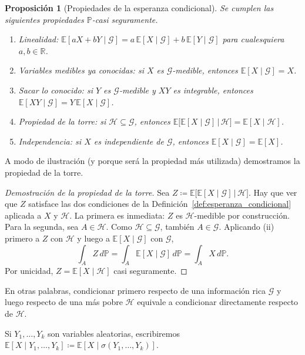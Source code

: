 \documentclass[11pt,a4paper,oneside]{report}
\theoremstyle{plain}
\newtheorem{proposicion}[teorema]{Proposición}
\theoremstyle{definition}
\theoremstyle{remark}
\newcommand{\R}{\mathbb{R}}
\newcommand{\E}{\mathbb{E}}
\newcommand{\PP}{\mathbb{P}}
\newcommand{\G}{\mathcal{G}}
\newcommand{\HH}{\mathcal{H}}
\newcommand{\1}{\mathbf{1}}
\newcommand{\eqdef}{\coloneqq}
\begin{document}
\begin{proposicion}[Propiedades de la esperanza condicional]
\label{prop:propiedades_esperanza_cond}
Se cumplen las siguientes propiedades $\PP$-casi seguramente.
\begin{enumerate}[label=\textnormal{(\roman*)}]
  \item \emph{Linealidad}: $\E[a X + b Y \mid \G] = a\, \E[X \mid \G]
        + b\, \E[Y \mid \G]$ para cualesquiera $a, b \in \R$.
  \item \emph{Variables medibles ya conocidas}: si $X$ es
        $\G$-medible, entonces $\E[X \mid \G] = X$.
  \item \emph{Sacar lo conocido}: si $Y$ es $\G$-medible y $XY$ es
        integrable, entonces $\E[XY \mid \G] = Y\, \E[X \mid \G]$.
  \item \emph{Propiedad de la torre}: si $\HH \subseteq \G$, entonces
        $\E\!\bigl[\E[X \mid \G] \,\big|\, \HH\bigr] = \E[X \mid \HH]$.
  \item Independencia: si $X$ es
independiente de $\G$, entonces $\E[X \mid \G] = \E[X]$.
\end{enumerate}
\end{proposicion}

A modo de ilustración (y porque será la propiedad más utilizada)
demostramos la propiedad de la torre.

\begin{proof}[Demostración de la propiedad de la torre]
Sea $Z \eqdef \E\bigl[\E[X \mid \G] \,\big|\, \HH\bigr]$. Hay que ver
que $Z$ satisface las dos condiciones de la
Definición~\ref{def:esperanza_condicional} aplicada a $X$ y $\HH$. La
primera es inmediata: $Z$ es $\HH$-medible por construcción. Para la
segunda, sea $A \in \HH$. Como $\HH \subseteq \G$, también $A \in \G$.
Aplicando (ii) primero a $Z$ con $\HH$ y luego a $\E[X \mid \G]$ con
$\G$,
\begin{equation*}
  \int_A Z \, d\PP = \int_A \E[X \mid \G] \, d\PP = \int_A X \, d\PP.
\end{equation*}
Por unicidad, $Z = \E[X \mid \HH]$ casi seguramente.
\end{proof}

En otras palabras, condicionar
primero respecto de una información rica $\G$ y luego respecto de
una más pobre $\HH$ equivale a condicionar directamente respecto de
$\HH$.

Si $Y_1, \ldots, Y_k$ son
variables aleatorias, escribiremos $\E[X \mid Y_1, \ldots, Y_k] \eqdef
\E[X \mid \sigma(Y_1, \ldots, Y_k)]$.
\end{document}
